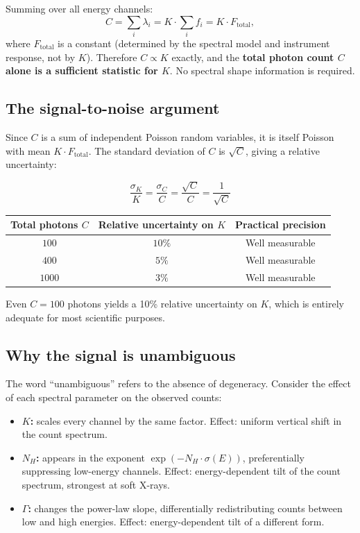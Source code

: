\documentclass[11pt, a4paper]{article}
\begin{document}
Summing over all energy channels:
\begin{equation}
    C = \sum_i \lambda_i = K \cdot \sum_i f_i = K \cdot F_\mathrm{total},
\end{equation}
where $F_\mathrm{total}$ is a constant (determined by the spectral model and instrument
response, not by $K$). Therefore $C \propto K$ exactly, and the \textbf{total photon
count $C$ alone is a sufficient statistic for $K$}. No spectral shape information is
required.

\subsection*{The signal-to-noise argument}

Since $C$ is a sum of independent Poisson random variables, it is itself Poisson with
mean $K \cdot F_\mathrm{total}$. The standard deviation of $C$ is $\sqrt{C}$, giving
a relative uncertainty:

\begin{equation}
    \boxed{
        \frac{\sigma_K}{K} = \frac{\sigma_C}{C} = \frac{\sqrt{C}}{C} = \frac{1}{\sqrt{C}}
    }
\end{equation}

\medskip
\begin{center}
\begin{tabular}{ccc}
\toprule
Total photons $C$ & Relative uncertainty on $K$ & Practical precision \\
\midrule
$100$  & $10\%$ & Well measurable \\
$400$  & $5\%$  & Well measurable \\
$1000$ & $3\%$  & Well measurable \\
\bottomrule
\end{tabular}
\end{center}
\medskip

Even $C = 100$ photons yields a 10\% relative uncertainty on $K$, which is entirely
adequate for most scientific purposes.

\subsection*{Why the signal is unambiguous}

The word ``unambiguous'' refers to the absence of degeneracy. Consider the effect of each
spectral parameter on the observed counts:

\begin{itemize}[noitemsep]
    \item \textbf{$K$:} scales every channel by the same factor.
        Effect: uniform vertical shift in the count spectrum.
    \item \textbf{$N_H$:} appears in the exponent $\exp(-N_H \cdot \sigma(E))$,
        preferentially suppressing low-energy channels.
        Effect: energy-dependent tilt of the count spectrum, strongest at soft X-rays.
    \item \textbf{$\Gamma$:} changes the power-law slope,
        differentially redistributing counts between low and high energies.
        Effect: energy-dependent tilt of a different form.
\end{itemize}
\end{document}
